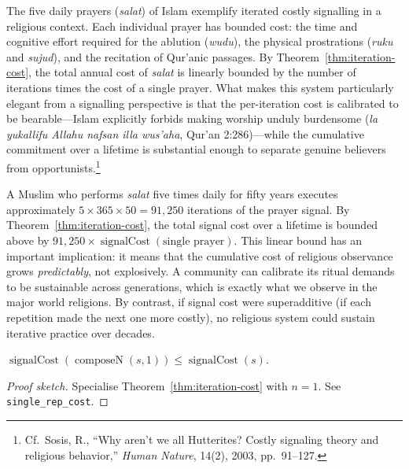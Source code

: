\begin{remark}
The five daily prayers (\textit{salat}) of Islam exemplify iterated
costly signalling in a religious context.  Each individual prayer has
bounded cost: the time and cognitive effort required for the ablution
(\textit{wudu}), the physical prostrations (\textit{ruku} and
\textit{sujud}), and the recitation of Qur'anic passages.  By
Theorem~\ref{thm:iteration-cost}, the total annual cost of
\textit{salat} is linearly bounded by the number of iterations times
the cost of a single prayer.  What makes this system particularly
elegant from a signalling perspective is that the per-iteration cost is
calibrated to be bearable---Islam explicitly forbids making worship
unduly burdensome (\textit{la yukallifu Allahu nafsan illa wus'aha},
Qur'an 2:286)---while the cumulative commitment over a lifetime is
substantial enough to separate genuine believers from
opportunists.\footnote{Cf.\ Sosis, R., ``Why aren't we all
  Hutterites? Costly signaling theory and religious behavior,''
  \textit{Human Nature}, 14(2), 2003, pp.~91--127.}
\end{remark}

\begin{example}
A Muslim who performs \textit{salat} five times daily for fifty years
executes approximately $5 \times 365 \times 50 = 91{,}250$ iterations
of the prayer signal.  By Theorem~\ref{thm:iteration-cost}, the total
signal cost over a lifetime is bounded above by
$91{,}250 \times \operatorname{signalCost}(\text{single prayer})$.
This linear bound has an important implication: it means that the
cumulative cost of religious observance grows \emph{predictably}, not
explosively.  A community can calibrate its ritual demands to be
sustainable across generations, which is exactly what we observe in
the major world religions.  By contrast, if signal cost were
superadditive (if each repetition made the next one more costly), no
religious system could sustain iterative practice over decades.
\end{example}

\begin{theorem}
\label{thm:single-rep-cost}
$\operatorname{signalCost}(\operatorname{composeN}(s, 1))
 \leq \operatorname{signalCost}(s)$.
\end{theorem}

\begin{proof}[Proof sketch]
Specialise Theorem~\ref{thm:iteration-cost} with $n = 1$.
See \texttt{single\_rep\_cost}.
\end{proof}

